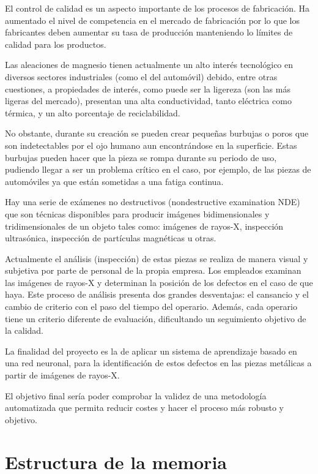 
El control de calidad es un aspecto importante de los procesos de fabricación. Ha aumentado el nivel de competencia en el mercado de fabricación por lo que los fabricantes deben aumentar su tasa de producción manteniendo lo límites de calidad para los productos.

Las aleaciones de magnesio tienen actualmente un alto interés tecnológico en diversos sectores industriales (como el del automóvil) debido, entre otras cuestiones, a propiedades de interés, como puede ser la ligereza (son las más ligeras del mercado), presentan una alta conductividad, tanto eléctrica como térmica, y un alto porcentaje de reciclabilidad.

No obstante, durante su creación se pueden crear pequeñas burbujas o poros que son indetectables por el ojo humano aun encontrándose en la superficie. Estas burbujas pueden hacer que la pieza se rompa durante su periodo de uso, pudiendo llegar a ser un problema crítico en el caso, por ejemplo, de las piezas de automóviles ya que están sometidas a una fatiga continua.

Hay una serie de exámenes no destructivos (nondestructive examination NDE) que son técnicas disponibles para producir imágenes bidimensionales y tridimensionales de un objeto tales como: imágenes de rayos-X, inspección ultrasónica, inspección de partículas magnéticas u otras.

Actualmente el análisis (inspección) de estas piezas se realiza de manera visual y subjetiva por parte de personal de la propia empresa. Los empleados examinan las imágenes de rayos-X y determinan la posición de los defectos en el caso de que haya. Este proceso de análisis presenta dos grandes desventajas: el cansancio y el cambio de criterio con el paso del tiempo del operario. Además, cada operario tiene un criterio diferente de evaluación, dificultando un seguimiento objetivo de la calidad.

La finalidad del proyecto es la de aplicar un sistema de aprendizaje basado en una red neuronal, para la identificación de estos defectos en las piezas metálicas a partir de imágenes de rayos-X.

El objetivo final sería poder comprobar la validez de una metodología automatizada que permita reducir costes y hacer el proceso más robusto y objetivo.

\section{Estructura de la memoria}

